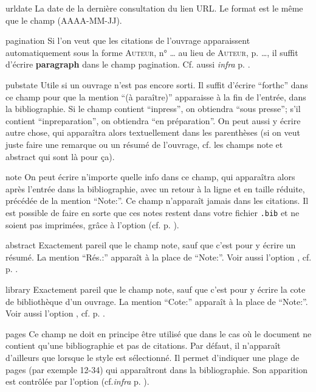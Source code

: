 \documentclass[a4paper]{ltxdockit}[2011/03/25]
\newcommand{\bbltxslb}{\sty{biblatex{\-}-swiss-{\-}legal-\-bibliography}\xspace}
\newcommand{\bib}{\texttt{.bib}\xspace}
\newcommand{\infra}{\emph{infra}\xspace}
\newcommand{\Cf}{\textnormal{Cf. }}
\newcommand{\cf}{cf.\xspace}
\newcommand{\GM}{\enquote}
\newcommand{\pex}{\textnormal{par exemple}\xspace}
\begin{document}
\begin{marglist}
\item[urldate]\label{urldate}La date de la dernière consultation du lien URL. Le format est le même que le champ  (AAAA-MM-JJ).

\item[pagination]\nXIMark\label{pagination}Si l'on veut que les citations de l'ouvrage apparaissent automatiquement sous la forme \textsc{Auteur}, n° … au lieu de \textsc{Auteur}, p. …, il suffit d'écrire \textbf{paragraph} dans le champ pagination. \Cf aussi \infra p. \pageref{citation}.

\item[pubstate]\label{pubstate}Utile si un ouvrage n'est pas encore sorti. Il suffit d'écrire \GM{forthc} dans ce champ pour que la mention \GM{(à paraître)} apparaisse à la fin de l'entrée, dans la bibliographie. Si le champ contient \GM{inpress}, on obtiendra \GM{sous presse}; s'il contient \GM{inpreparation}, on obtiendra \GM{en préparation}. On peut aussi y écrire autre chose, qui apparaîtra alors textuellement dans les parenthèses (si on veut juste faire une remarque ou un résumé de l'ouvrage, cf. les champs note et abstract qui sont là pour ça).

\item[note]\label{note}On peut écrire n'importe quelle info dans ce champ, qui apparaîtra alors après l'entrée dans la bibliographie, avec un retour à la ligne et en taille réduite, précédée de la mention \GM{Note:}. Ce champ n'apparaît jamais dans les citations. Il est possible de faire en sorte que ces notes restent dans votre fichier \bib et ne soient pas imprimées, grâce à l'option  (\cf p. \pageref{notes}).

\item[abstract]\label{abstract}Exactement pareil que le champ note, sauf que c'est pour y écrire un résumé. La mention \GM{Rés.:} apparaît à la place de \GM{Note:}. Voir aussi l'option , \cf p. \pageref{abstracts}.

\item[library]\label{library}Exactement pareil que le champ note, sauf que c'est pour y écrire la cote de bibliothèque d'un ouvrage. La mention \GM{Cote:} apparaît à la place de \GM{Note:}.  Voir aussi l'option , \cf p. \pageref{optlibrary}.

\item[pages]\label{pagesbook}
Ce champ ne doit en principe être utilisé que dans le cas où le document ne contient qu'une bibliographie et pas de citations. Par défaut, il n'apparaît d'ailleurs que lorsque le style \bbltxslb est sélectionné.
Il permet d'indiquer une plage de pages (\pex 12-34) qui apparaîtront dans la bibliographie. Son apparition est contrôlée par l'option  (\cf \infra p. \pageref{bookspages}).


\end{marglist}
\end{document}
